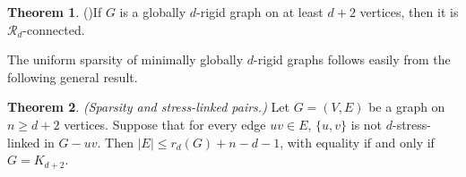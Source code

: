 \documentclass[11pt,a4paper,dvipsnames]{scrartcl}
\theoremstyle{definition}
\newtheorem{theorem}{Theorem}[section]
\newcommand{\globrig}[1]{globally $#1$-rigid}
\newcommand{\strongly}[1]{${#1}$-stress-linked}
\begin{document}
\begin{theorem} (\cite[Theorem 3.5]{garamvolgyi.etal_2022})\label{theorem:globallyrigidMconnected}
    If $G$ is a \globrig{d} graph on at least $d+2$ vertices, then it is $\mathcal{R}_d$-connected.
\end{theorem}

\noindent The uniform sparsity of minimally globally $d$-rigid graphs follows easily from the following general result. 

\begin{theorem}\label{theorem:sparsity} \emph{(Sparsity and stress-linked pairs.)} \newline
    Let $G = (V,E)$ be a graph on $n \geq d+2$ vertices. Suppose that for every edge $uv \in E$, $\{u,v\}$ is not \strongly{d} in $G-uv$. Then $|E| \leq r_d(G) + n - d - 1$, with equality if and only if $G = K_{d+2}$. 
\end{theorem}
\end{document}
